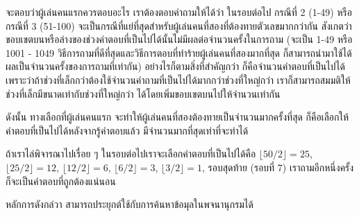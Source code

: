 \begin{quizans}
จะ{\wbr}ตอบ{\wbr}ว่า{\wbr}ผู้{\wbr}เล่น{\wbr}คน{\wbr}แรก{\wbr}ควร{\wbr}ตอบ{\wbr}อะไร เรา{\wbr}ต้อง{\wbr}ตอบ{\wbr}คำถาม{\wbr}ให้{\wbr}ได้{\wbr}ว่า ใน{\wbr}รอบ{\wbr}ต่อไป กรณี{\wbr}ที่ 2
(1-49) หรือ{\wbr}กรณี{\wbr}ที่ 3 (51-100)
จะ{\wbr}เป็น{\wbr}กรณี{\wbr}ที่{\wbr}แย่{\wbr}ที่สุด{\wbr}สำหรับ{\wbr}ผู้{\wbr}เล่น{\wbr}คน{\wbr}ที่{\wbr}สอง{\wbr}ที่{\wbr}ต้อง{\wbr}ทาย{\wbr}ตัวเลข{\wbr}มาก{\wbr}กว่า{\wbr}กัน{\wbr}
สังเกต{\wbr}ว่า{\wbr}ขอบเขต{\wbr}บน{\wbr}หรือ{\wbr}ล่าง{\wbr}ของ{\wbr}ช่วง{\wbr}คำตอบ{\wbr}ที่{\wbr}เป็น{\wbr}ไป{\wbr}ได้{\wbr}นั้น{\wbr}ไม่{\wbr}มี{\wbr}ผล{\wbr}ต่อ{\wbr}จำนวน{\wbr}ครั้ง{\wbr}ใน{\wbr}การ{\wbr}ถาม{\wbr}
(จะ{\wbr}เป็น 1-49 หรือ 1001 - 1049
วิธีการ{\wbr}ถาม{\wbr}ที่{\wbr}ดี{\wbr}ที่สุด{\wbr}และ{\wbr}วิธีการ{\wbr}ตอบ{\wbr}ที่{\wbr}ทำร้าย{\wbr}ผู้{\wbr}เล่น{\wbr}คน{\wbr}ที่{\wbr}สอง{\wbr}มาก{\wbr}ที่สุด{\wbr}
ก็{\wbr}สามารถ{\wbr}นำมา{\wbr}ใช้ได้{\wbr}ผล{\wbr}เป็น{\wbr}จำนวน{\wbr}ครั้ง{\wbr}ของ{\wbr}การ{\wbr}ถาม{\wbr}ที่{\wbr}เท่า{\wbr}กัน) อย่างไรก็ตาม{\wbr}สิ่ง{\wbr}ที่{\wbr}สำคัญ{\wbr}กว่า{\wbr}
ก็{\wbr}คือ{\wbr}จำนวน{\wbr}คำตอบ{\wbr}ที่{\wbr}เป็น{\wbr}ไป{\wbr}ได้{\wbr}
เพราะว่า{\wbr}ถ้า{\wbr}ช่วง{\wbr}ที่{\wbr}เล็ก{\wbr}กว่า{\wbr}ต้อง{\wbr}ใช้{\wbr}จำนวน{\wbr}คำถาม{\wbr}ที่{\wbr}เป็น{\wbr}ไป{\wbr}ได้{\wbr}มาก{\wbr}กว่า{\wbr}ช่วง{\wbr}ที่{\wbr}ใหญ่{\wbr}กว่า{\wbr}
เรา{\wbr}ก็{\wbr}สามารถ{\wbr}สมมติ{\wbr}ให้{\wbr}ช่วง{\wbr}ที่{\wbr}เล็ก{\wbr}มี{\wbr}ขนาด{\wbr}เท่า{\wbr}กับ{\wbr}ช่วง{\wbr}ที่{\wbr}ใหญ่{\wbr}กว่า{\wbr}
ได้{\wbr}โดย{\wbr}เพิ่ม{\wbr}ขอบเขต{\wbr}บน{\wbr}ไป{\wbr}ให้{\wbr}จำนวน{\wbr}เท่า{\wbr}กัน 

ดังนั้น ทางเลือก{\wbr}ที่{\wbr}ผู้{\wbr}เล่น{\wbr}คน{\wbr}แรก จะ{\wbr}ทำ{\wbr}ให้{\wbr}ผู้{\wbr}เล่น{\wbr}คน{\wbr}ที่{\wbr}สอง{\wbr}ต้อง{\wbr}ทาย{\wbr}เป็น{\wbr}จำนวน{\wbr}มาก{\wbr}ครั้ง{\wbr}ที่สุด{\wbr}
ก็{\wbr}คือ{\wbr}เลือก{\wbr}ให้{\wbr}คำตอบ{\wbr}ที่{\wbr}เป็น{\wbr}ไป{\wbr}ได้{\wbr}หลังจาก{\wbr}รู้{\wbr}คำตอบ{\wbr}แล้ว มี{\wbr}จำนวน{\wbr}มาก{\wbr}ที่สุด{\wbr}เท่า{\wbr}ที่{\wbr}จะ{\wbr}ทำ{\wbr}ได้{\wbr}

ถ้า{\wbr}เรา{\wbr}ไล่{\wbr}พิจารณา{\wbr}ไป{\wbr}เรื่อย ๆ ใน{\wbr}รอบ{\wbr}ต่อไป{\wbr}เรา{\wbr}จะ{\wbr}เลือก{\wbr}คำตอบ{\wbr}ที่{\wbr}เป็น{\wbr}ไป{\wbr}ได้{\wbr}คือ $\lfloor
50/2\rfloor=25$, $\lfloor 25/2\rfloor=12$, $\lfloor 12/2\rfloor=6$,
$\lfloor 6/2\rfloor=3$, $\lfloor 3/2\rfloor=1$, รอบ{\wbr}สุดท้าย (รอบ{\wbr}ที่ 7)
เรา{\wbr}ถาม{\wbr}อีก{\wbr}หนึ่ง{\wbr}ครั้ง ก็{\wbr}จะ{\wbr}เป็น{\wbr}คำตอบ{\wbr}ที่{\wbr}ถูกต้อง{\wbr}แน่นอน{\wbr}
\end{quizans}

หลักการ{\wbr}ดัง{\wbr}กล่{\wbr}วา สามารถ{\wbr}ประยุกต์{\wbr}ใช้{\wbr}กับ{\wbr}การ{\wbr}ค้นหา{\wbr}ข้อ{\wbr}มุ{\wbr}ล{\wbr}ใน{\wbr}พจนานุกรม{\wbr}ได้{\wbr}

